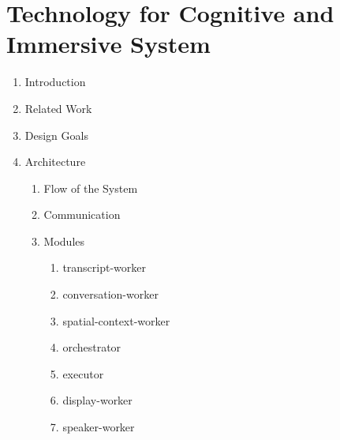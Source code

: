 \chapter{Technology for Cognitive and Immersive System}

\begin{enumerate}
    \item Introduction
    \item Related Work
    \item Design Goals
    \item Architecture
    \begin{enumerate}
        \item Flow of the System
        \item Communication
        \item Modules
        \begin{enumerate}
            \item transcript-worker
            \item conversation-worker
            \item spatial-context-worker
            \item orchestrator
            \item executor
            \item display-worker
            \item speaker-worker
        \end{enumerate}
    \end{enumerate}
\end{enumerate}